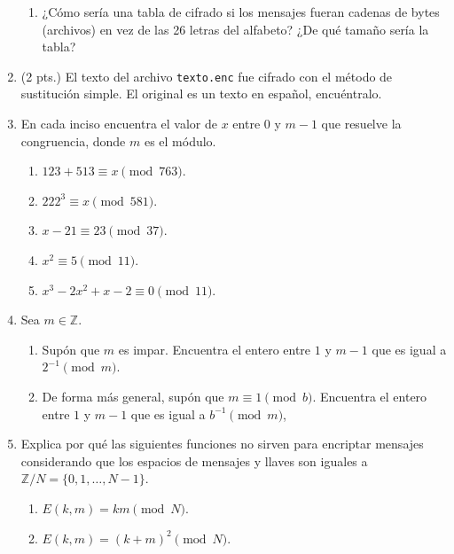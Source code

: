 \documentclass[11pt]{article} %
\newcommand{\ZZ}{\mathbb{Z}}
\begin{document}
\begin{enumerate}
\begin{enumerate}
			\item ¿Cómo sería una tabla de cifrado si los mensajes fueran cadenas de bytes (archivos) en vez de las 26 letras del alfabeto? ¿De qué tamaño sería la tabla?
		\end{enumerate}
	
		\item (2 pts.) El texto del archivo \texttt{texto.enc} fue cifrado con el método de sustitución simple. El original es un texto en español, encuéntralo.
		
		\item En cada inciso encuentra el valor de $ x $ entre $ 0 $ y $ m-1 $ que resuelve la congruencia, donde $ m $ es el módulo.
		\begin{enumerate}
			\item $ 123 + 513 \equiv x \pmod{763} $.
			\item $ 222^3 \equiv x \pmod{581} $.
			\item $ x - 21 \equiv 23 \pmod{37} $.
			\item $ x^{2} \equiv 5 \pmod{11} $.
			\item $ x^{3} - 2x^{2} + x - 2 \equiv 0 \pmod{11} $.
		\end{enumerate}
	
		\item Sea $ m \in \ZZ $.
		\begin{enumerate}
			\item Supón que $ m $ es impar. Encuentra el entero entre $ 1 $ y $ m-1 $ que es igual a $ 2^{-1} \pmod{m} $.
			\item De forma más general, supón que $ m \equiv 1 \pmod{b} $. Encuentra el entero entre $ 1 $ y $ m-1 $ que es igual a $ b^{-1} \pmod{m} $,
		\end{enumerate}
		
		\item Explica por qué las siguientes funciones no sirven para encriptar mensajes considerando que los espacios de mensajes y llaves son iguales a $ \ZZ/N = \{0,1,\ldots,N-1\} $.
		\begin{enumerate}
			\item $ E(k,m) = km \pmod{N} $.
			\item $ E(k,m) = (k+m)^{2} \pmod{N} $.
		\end{enumerate}
		

\end{enumerate}
\end{document}
